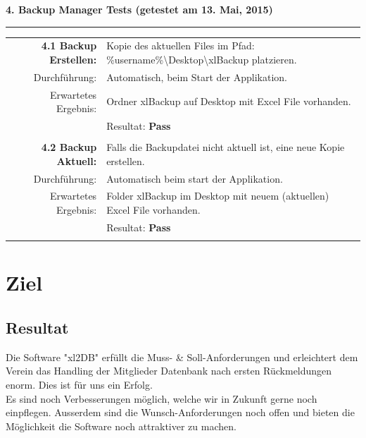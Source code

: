 \documentclass{article}
\begin{document}
\textbf{4. Backup Manager Tests (getestet am 13. Mai, 2015)\\}
\rule[2mm]{1\linewidth}{0.3mm}
\begin{tabular}{r|p{12cm}}
	\textbf{4.1 Backup Erstellen:} & Kopie des aktuellen Files im Pfad: \%username\%\textbackslash Desktop\textbackslash xlBackup platzieren. \\
		Durchführung:			& Automatisch, beim Start der Applikation.\\
		Erwartetes Ergebnis: 	& Ordner xlBackup auf Desktop mit Excel File vorhanden. \\
								& Resultat:  \textbf{Pass}\hspace{9cm} \color{green} {\ding{51}} \\
								\\	
	
	\textbf{4.2 Backup Aktuell:} & Falls die Backupdatei nicht aktuell ist, eine neue Kopie erstellen. \\
		Durchführung:			& Automatisch beim start der Applikation.\\
		Erwartetes Ergebnis: 	& Folder xlBackup im Desktop mit neuem (aktuellen) Excel File vorhanden. \\
								& Resultat:  \textbf{Pass}\hspace{9cm} \color{green} {\ding{51}} \\
								\\	
\end{tabular}
						

\newpage


\section{Ziel}
\subsection{Resultat}

Die Software "xl2DB" erfüllt die Muss- \& Soll-Anforderungen und erleichtert dem Verein das Handling der Mitglieder Datenbank nach ersten Rückmeldungen enorm. Dies ist für uns ein Erfolg. \\
Es sind noch Verbesserungen möglich, welche wir in Zukunft gerne noch einpflegen. Ausserdem sind die Wunsch-Anforderungen noch offen und bieten die Möglichkeit die Software noch attraktiver zu machen.
\end{document}
